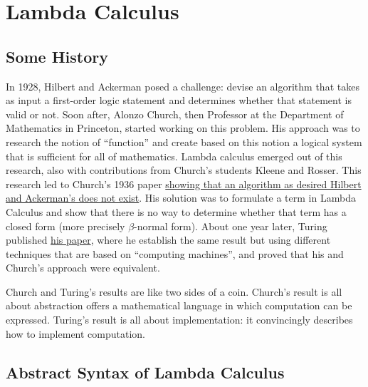 \chapter{ Lambda Calculus}
\label{ch:lambda}


\section{Some History}
\label{sec:lambda::history}

\begin{gram}
\label{grm:lambda::history}
In 1928, Hilbert and Ackerman posed a challenge: devise an algorithm that takes as input a  first-order logic statement and determines whether that statement is valid or not.
%
Soon after, Alonzo Church, then Professor at the Department of Mathematics in Princeton, 
started working on this problem.  His approach was to research the notion of ``function'' and create based on this notion a logical system that is sufficient for all of mathematics.
%
Lambda calculus emerged out of this research, also with contributions from 
Church's students Kleene and Rosser.
%
This research led to Church's 1936 paper 
\href{http://www.umut-acar.org/greats/church-1936.pdf}{showing that an algorithm as desired Hilbert and Ackerman's does not exist}.
%
His solution was to formulate a term in Lambda Calculus and show that there is no way to determine whether that term has a closed form (more precisely $\beta$-normal form). 
%
About one year later, Turing published \href{http://www.umut-acar.org/greats/turing-1937.pdf}{his paper}, where he establish the same result but using different techniques that are based on ``computing machines'', and 
%
proved that his and Church's approach were equivalent.

\end{gram}

\begin{gram}
\label{grm:lambda::church-and-turing}
Church and Turing's results are like two sides of a coin.  
%
Church's result is all about abstraction  offers a mathematical language in which computation can be expressed.
%
Turing's result is all about implementation: it convincingly describes how to implement computation.
%
\end{gram}

\section{Abstract Syntax of Lambda Calculus}
\label{sec:lambda::syn} 

